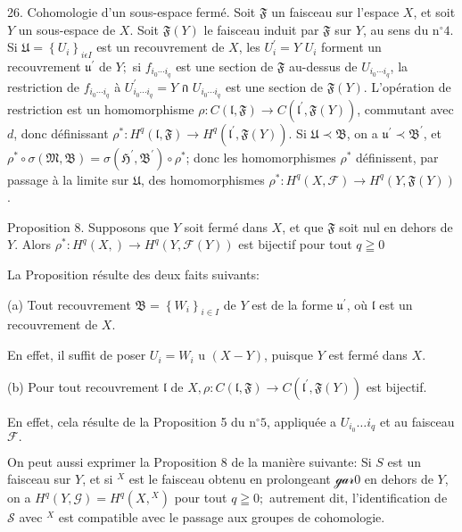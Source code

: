 26. Cohomologie d'un sous-espace fermé. Soit $\mathfrak{F}$ un faisceau sur l'espace $X$, et soit $Y$ un sous-espace de $X$. Soit $\mathfrak{F}(Y)$ le faisceau induit par $\mathfrak{F}$ sur $Y$, au sens du $\mathrm{n}^{\circ} 4 .$ Si $\mathfrak{U}=\left\{U_{i}\right\}_{i \epsilon I}$ est un recouvrement de $X$, les $U_{i}^{\prime}=Y$ \cap $U_{i}$ forment un recouvrement $\mathfrak{u}^{\prime}$ de $Y ;$ si $f_{i_{0} \cdots i_{q}}$ est une section de $\mathfrak{F}$ au-dessus de $U_{i_{0} \cdots i_{q}}$, la restriction de $f_{i_{0} \cdots i_{q}}$ à $U_{i_{0} \cdots i_{q}}^{\prime}=Y$ ก $U_{i_{0} \cdots i_{q}}$ est une section de $\mathfrak{F}(Y)$. L'opération de restriction est un homomorphisme $\rho: C(\mathfrak{l}, \mathfrak{F}) \rightarrow C\left(\mathfrak{l}^{\prime}, \mathfrak{F}(Y)\right)$, commutant avec $d$, donc définissant $\rho^{*}: H^{q}(\mathfrak{l}, \mathfrak{F}) \rightarrow H^{q}\left(\mathfrak{l}^{\prime}, \mathfrak{F}(Y)\right)$. Si $\mathfrak{U} \prec \mathfrak{B}$, on a $\mathfrak{u}^{\prime} \prec \mathfrak{B}^{\prime}$, et $\rho^{*} \circ \sigma(\mathfrak{M}, \mathfrak{B})=\sigma\left(\mathfrak{H}^{\prime}, \mathfrak{B}^{\prime}\right) \circ \rho^{*}$; donc les homomorphismes $\rho^{*}$ définissent, par passage à la limite sur $\mathfrak{U}$, des homomorphismes $\rho^{*}: H^{q}(X, \mathcal{F}) \rightarrow H^{q}(Y, \mathfrak{F}(Y))$.

Proposition 8. Supposons que $Y$ soit fermé dans $X$, et que $\mathfrak{F}$ soit nul en dehors de $Y .$ Alors $\rho^{*}: H^{q}(X, \mathfrak{}) \rightarrow H^{q}(Y, \mathcal{F}(Y))$ est bijectif pour tout $q \geqq 0$

La Proposition résulte des deux faits suivants:

(a) Tout recouvrement $\mathfrak{B}=\left\{W_{i}\right\}_{i \in I}$ de $Y$ est de la forme $\mathfrak{u}^{\prime}$, où $\mathfrak{l}$ est un recouvrement de $X$.

En effet, il suffit de poser $U_{i}=W_{i}$ u $(X-Y)$, puisque $Y$ est fermé dans $X$.

(b) Pour tout recouvrement $\mathfrak{l}$ de $X, \rho: C(\mathfrak{l}, \mathfrak{F}) \rightarrow C\left(\mathfrak{l}^{\prime}, \mathfrak{F}(Y)\right)$ est bijectif.

En effet, cela résulte de la Proposition 5 du $\mathrm{n}^{\circ} 5$, appliquée a $U_{i_{0}} \ldots i_{q}$ et au faisceau $\mathcal{F} .$

On peut aussi exprimer la Proposition 8 de la manière suivante: Si $S$ est un faisceau sur $Y$, et si $\mathcal{}^{X}$ est le faisceau obtenu en prolongeant $\mathcal{g a r} 0$ en dehors de $Y$, on a $H^{q}(Y, \mathcal{G})=H^{q}\left(X, \mathcal{}^{X}\right)$ pour tout $q \geqq 0 ;$ autrement dit, l'identification de $\mathcal{S}$ avec $\mathcal{}^{X}$ est compatible avec le passage aux groupes de cohomologie.

